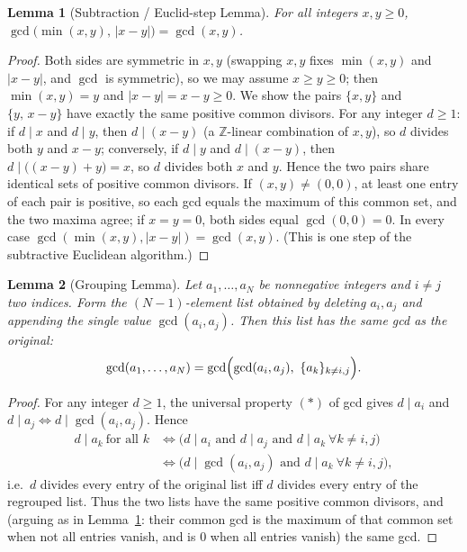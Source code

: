 \documentclass[11pt]{article}
\theoremstyle{plain}
\newtheorem{lemma}{Lemma}
\theoremstyle{definition}
\theoremstyle{remark}
\begin{document}
\begin{lemma}[Subtraction / Euclid-step Lemma]\label{lem:E}
For all integers $x,y\ge 0$, $\gcd\bigl(\min(x,y),\,|x-y|\bigr)=\gcd(x,y)$.
\end{lemma}

\begin{proof}
Both sides are symmetric in $x,y$ (swapping $x,y$ fixes $\min(x,y)$ and
$|x-y|$, and $\gcd$ is symmetric), so we may assume $x\ge y\ge 0$; then
$\min(x,y)=y$ and $|x-y|=x-y\ge 0$. We show the pairs $\{x,y\}$ and
$\{y,\,x-y\}$ have exactly the same positive common divisors. For any integer
$d\ge 1$: if $d\mid x$ and $d\mid y$, then $d\mid(x-y)$ (a $\mathbb{Z}$-linear
combination of $x,y$), so $d$ divides both $y$ and $x-y$; conversely, if
$d\mid y$ and $d\mid(x-y)$, then $d\mid\bigl((x-y)+y\bigr)=x$, so $d$ divides
both $x$ and $y$. Hence the two pairs share identical sets of positive common
divisors. If $(x,y)\ne(0,0)$, at least one entry of each pair is positive, so
each gcd equals the maximum of this common set, and the two maxima agree; if
$x=y=0$, both sides equal $\gcd(0,0)=0$. In every case
$\gcd(\min(x,y),|x-y|)=\gcd(x,y)$. (This is one step of the subtractive
Euclidean algorithm.)
\end{proof}

\begin{lemma}[Grouping Lemma]\label{lem:F}
Let $a_1,\dots,a_N$ be nonnegative integers and $i\ne j$ two indices. Form the
$(N-1)$-element list obtained by deleting $a_i,a_j$ and appending the single
value $\gcd(a_i,a_j)$. Then this list has the same gcd as the original:
\[
\gcd(a_1,\dots,a_N)=\gcd\Bigl(\gcd(a_i,a_j),\ \{a_k\}_{k\ne i,j}\Bigr).
\]
\end{lemma}

\begin{proof}
For any integer $d\ge 1$, the universal property $(\ast)$ of gcd gives
$d\mid a_i$ and $d\mid a_j\iff d\mid\gcd(a_i,a_j)$. Hence
\begin{align*}
d\mid a_k\ \text{for all }k
&\iff \bigl(d\mid a_i\text{ and }d\mid a_j\text{ and }d\mid a_k\ \forall k\ne i,j\bigr)\\
&\iff \bigl(d\mid\gcd(a_i,a_j)\text{ and }d\mid a_k\ \forall k\ne i,j\bigr),
\end{align*}
i.e.\ $d$ divides every entry of the original list iff $d$ divides every entry
of the regrouped list. Thus the two lists have the same positive common
divisors, and (arguing as in Lemma~\ref{lem:E}: their common gcd is the
maximum of that common set when not all entries vanish, and is $0$ when all
entries vanish) the same gcd.
\end{proof}
\end{document}
